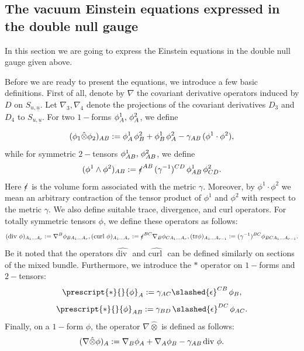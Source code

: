 \documentclass{amsart}
\newcommand{\hsp}{\hspace{.5mm}}
\newcommand{\ubar}{\underline{u}}
\newcommand{\Hodge}[1]{\prescript{*}{}{#1}}
\renewcommand{\div}{\mbox{div }}
\newcommand{\curl}{\mbox{curl }}
\newcommand{\tr}{\mbox{tr}}
\begin{document}
\subsection{The vacuum Einstein equations expressed in the double null gauge}
	\noindent In this section we are going to express the Einstein equations in the double null gauge given above.  
  


 \vspace{3mm}

 \par\noindent Before we are ready to present the equations, we introduce a few basic definitions. First of all, denote by $\nabla$ the covariant derivative operators induced by $D$ on $S_{u,\ubar}$. Let $\nabla_3, \nabla_4$ denote the projections of the covariant derivatives $D_3$ and $D_4$ to $S_{u,\ubar}$. For two $1-$forms $\phi_A^{1}, \hsp \phi_A^{2}$, we define 

 \[ (\phi_1 \hat{\otimes} \phi_2)_{AB} := \phi_A^1 \hsp \phi_B^2 + \phi_B^1 \hsp \phi_A^2 - \gamma_{AB}\hsp (\phi^1 \cdot \phi^2),   \]while for symmetric $2-$tensors $\phi_{AB}^1, \hsp \phi_{AB}^2$, we define 
 \[  (\phi^1 \wedge \phi^2)_{AB} := \slashed{\epsilon}^{AB} \hsp(\gamma^{-1})^{CD} \hsp\phi_{AB}^1 \hsp \phi_{CD}^2.    \]Here $\slashed{\epsilon}$ is the volume form associated with the metric $\gamma$. Moreover, by $\phi^1 \cdot \phi^2$ we mean an arbitrary contraction of the tensor product of $\phi^1$ and $\phi^2$ with respect to the metric $\gamma$. We also define suitable trace, divergence, and curl operators. For totally symmetric tensors $\phi$, we define these operators as follows:
 \[  (\div \phi)_{A_1 \dots A_r}:= \nabla^{B}\phi_{B A_1 \dots A_r},  (\curl \phi)_{A_1\dots A_r} := \slashed{\epsilon}^{BC}\nabla_B \phi_{C A_1\dots A_r}, (\tr\phi)_{A_1 \dots A_{r-1}} :=    (\gamma^{-1})^{BC} \phi_{BC A_1 \dots A_{r-1}}.        \]Be it noted that the operators $\widehat{\div}$ and $\widehat{\curl}$ can be defined similarly on sections of the mixed bundle. Furthermore, we introduce the $*$ operator on $1-$forms and $2-$tensors:
 \[ \Hodge{\phi}_A := \gamma_{AC}\slashed{\epsilon}^{CB}\hsp \phi_B,        \] \[ \Hodge{\phi}_{AB} := \gamma_{BD} \hsp \slashed{\epsilon}^{DC}\hsp \phi_{AC}.  \]
 Finally, on a $1-$form $\phi$, the operator $\nabla \hat{\otimes}$ is defined as follows:  \[(\nabla \hat{\otimes} \phi)_{A} := \nabla_B \phi_A + \nabla_A \phi_B - \gamma_{AB} \hsp \div \phi. \] 
\end{document}
